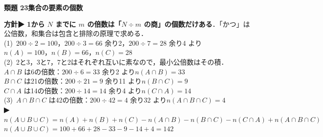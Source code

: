 \documentclass[a4paper,11pt]{ltjsarticle}
\newcommand{\ans}[2]{\Needspace{5\baselineskip}\vspace{6pt}%
  {\sffamily\bfseries 類題 #1\quad #2}\par}
\newcommand{\point}[1]{\textsf{\bfseries ▶ #1}}
\begin{document}
\ans{23}{集合の要素の個数}
\begin{kai}
\textbf{方針}\quad \point{1から $N$ までに $m$ の倍数は「$N\div m$ の商」の個数だけある}．「かつ」は公倍数，和集合は包含と排除の原理で求める．\\[2pt]
(1)\ $200\div2=100$，\quad $200\div3=66$ 余り2，\quad $200\div7=28$ 余り4 より\\
\hspace*{1.5em}$n(A)=100$，\quad $n(B)=66$，\quad $n(C)=28$\\[2pt]
(2)\ 2と3，3と7，7と2はそれぞれ互いに素なので，最小公倍数はその積．\\
\hspace*{1.5em}$A\cap B$ は6の倍数：$200\div6=33$ 余り2 より\quad $n(A\cap B)=33$\\
\hspace*{1.5em}$B\cap C$ は21の倍数：$200\div21=9$ 余り11 より\quad $n(B\cap C)=9$\\
\hspace*{1.5em}$C\cap A$ は14の倍数：$200\div14=14$ 余り4 より\quad $n(C\cap A)=14$\\[2pt]
(3)\ $A\cap B\cap C$ は42の倍数：$200\div42=4$ 余り32 より\quad $n(A\cap B\cap C)=4$\\[2pt]
\hspace*{1.5em}\point{$n(A\cup B\cup C)=n(A)+n(B)+n(C)-n(A\cap B)-n(B\cap C)-n(C\cap A)+n(A\cap B\cap C)$}\\
\hspace*{1.5em}$n(A\cup B\cup C)=100+66+28-33-9-14+4=142$
\end{kai}
\end{document}
